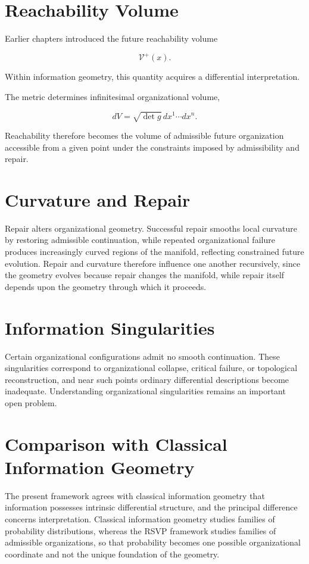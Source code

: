 \documentclass[11pt,oneside]{book}
\numberwithin{equation}{chapter}
\theoremstyle{definition}
\theoremstyle{plain}
\begin{document}
\section{Reachability Volume}

Earlier chapters introduced the future reachability volume

\[
\mathcal V^+(x).
\]

Within information geometry, this quantity acquires a differential
interpretation.

The metric determines infinitesimal organizational volume,

\[
dV
=
\sqrt{\det g}
\,dx^1
\cdots
dx^n.
\]

Reachability therefore becomes the volume of admissible future
organization accessible from a given point under the constraints imposed
by admissibility and repair.

\section{Curvature and Repair}

Repair alters organizational geometry. Successful repair smooths local curvature by restoring admissible continuation, while repeated organizational failure produces increasingly curved regions of the manifold, reflecting constrained future evolution. Repair and curvature therefore influence one another recursively, since the geometry evolves because repair changes the manifold, while repair itself depends upon the geometry through which it proceeds.

\section{Information Singularities}

Certain organizational configurations admit no smooth continuation. These singularities correspond to organizational collapse, critical failure, or topological reconstruction, and near such points ordinary differential descriptions become inadequate. Understanding organizational singularities remains an important open problem.

\section{Comparison with Classical Information Geometry}

The present framework agrees with classical information geometry that information possesses intrinsic differential structure, and the principal difference concerns interpretation. Classical information geometry studies families of probability distributions, whereas the RSVP framework studies families of admissible organizations, so that probability becomes one possible organizational coordinate and not the unique foundation of the geometry.
\end{document}
